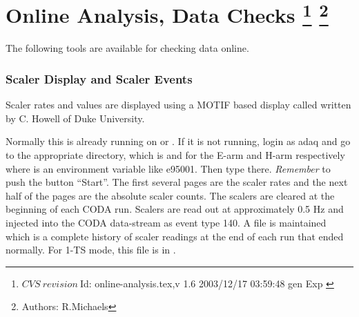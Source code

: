 \chapter[Online Analysis, Data Checks]{Online Analysis, Data Checks
\footnote{
  $CVS~revision~ $Id: online-analysis.tex,v 1.6 2003/12/17 03:59:48 gen Exp $ $
}
\footnote{Authors: R.Michaels }
}
 
\par
The following tools are available for checking
data online.


\subsection{Scaler Display and Scaler Events}
Scaler rates and values are displayed using
a MOTIF based display called 
written by C. Howell of Duke University.

Normally this is already running on  or .
If it is not running, login as
adaq and go to the appropriate directory,
which is 
and
for the E-arm and H-arm respectively
where  is an environment
variable like e95001.
Then type  there.  
{\it Remember} to push the button ``Start''.
The first several pages are the scaler rates and
the next half of the pages are the absolute
scaler counts.  The scalers are cleared at
the beginning of each CODA run.
Scalers are read out at approximately 0.5 Hz 
and injected into the CODA data-stream 
as event type 140.  A file
 is maintained which is
a complete history of scaler readings at
the end of each run that ended normally.
For 1-TS mode, this file is in .


